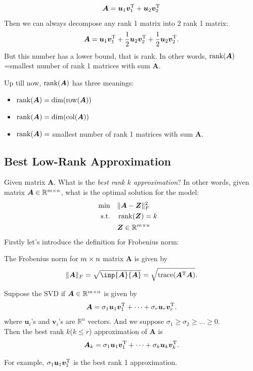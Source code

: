 \[
\bm A=\bm u_1\bm v_1^{\mathrm T}+\bm u_2\bm v_2^{\mathrm T}
\]
Then we can always decompose any rank 1 matrix into 2 rank 1 matrix:
\[
\bm A=\bm u_1\bm v_1^{\mathrm T}+\frac{1}{2}\bm u_2\bm v_2^{\mathrm T}+\frac{1}{2}\bm u_2\bm v_2^{\mathrm T}.
\]
But this number has a lower bound, that is rank. In other words, $\operatorname{rank}(\bm A)$=smallest number of rank 1 matrices with sum $\bm A$.
\begin{remark}
Up till now, $\operatorname{rank}(\bm A)$ has three meanings:
\begin{itemize}
\item
$\operatorname{rank}(\bm A)=\dim(\operatorname{row}(\bm A))$
\item
$\operatorname{rank}(\bm A)=\dim(\operatorname{col}(\bm A))$
\item
$\operatorname{rank}(\bm A)=$ smallest number of rank 1 matrices with sum $\bm A$.
\end{itemize}
\end{remark}
\subsection{Best Low-Rank Approximation}
Given matrix $\bm A$. What is the \textit{best rank $k$ approximation}? In other words, given matrix $\bm A\in\mathbb{R}^{m\times n}$, what is the optimal solution for the model:
\begin{align*}
  \min\quad        & \|\bm A-\bm Z\|^2_{F} \\
  \text{s.t.\quad} &  \operatorname{rank}(\bm Z)=k &     \\
                   &\bm Z\in\mathbb{R}^{m\times n}
\end{align*}
Firstly let's introduce the definition for Frobenius norm:
\begin{definition}
The Frobenius norm for $m\times n$ matrix $\bm A$ is given by
\[
\|\bm A\|_{F}=\sqrt{\inp{\bm A}{\bm A}}=\sqrt{\trace(\bm A\trans\bm A)}.
\]
\end{definition}
\begin{theorem}\label{proposition_8.4}
Suppose the SVD if $\bm A\in\mathbb{R}^{m\times n}$ is given by
\[
\bm A=\sigma_1\bm u_1\bm v_1^{\mathrm T}+\dots+\sigma_r\bm u_r\bm v_r^{\mathrm T}.
\]
where $\bm u_i$'s and $\bm v_i$'s are $\mathbb{R}^{n}$ vectors. And we suppose $\sigma_1\ge\sigma_2\ge\dots\ge0$.\\
Then the best rank $k$($k\le r$) approximation of $\bm A$ is
\[
\bm A_k=\sigma_1\bm u_1\bm v_1^{\mathrm T}+\dots+\sigma_k\bm u_k\bm v_k^{\mathrm T}.
\]
\end{theorem}
For example, $\sigma_1\bm u_1\bm v_1^{\mathrm T}$ is the best rank 1 approximation.
